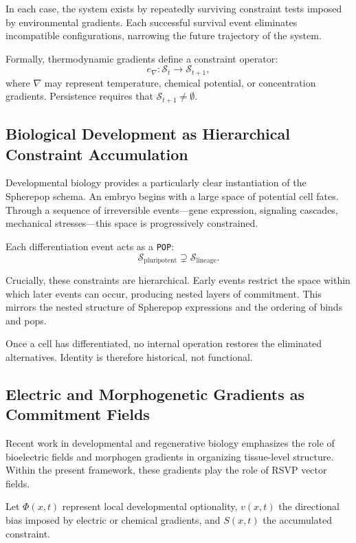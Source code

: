\documentclass[11pt]{article}
\begin{document}
In each case, the system exists by repeatedly surviving constraint tests imposed by environmental gradients. Each successful survival event eliminates incompatible configurations, narrowing the future trajectory of the system.

Formally, thermodynamic gradients define a constraint operator:
\[
e_{\nabla} : \mathcal{S}_t \rightarrow \mathcal{S}_{t+1},
\]
where $\nabla$ may represent temperature, chemical potential, or concentration gradients. Persistence requires that $\mathcal{S}_{t+1} \neq \emptyset$.

\subsection{Biological Development as Hierarchical Constraint Accumulation}

Developmental biology provides a particularly clear instantiation of the Spherepop schema. An embryo begins with a large space of potential cell fates. Through a sequence of irreversible events—gene expression, signaling cascades, mechanical stresses—this space is progressively constrained.

Each differentiation event acts as a \texttt{POP}:
\[
\mathcal{S}_{\text{pluripotent}} \supsetneq \mathcal{S}_{\text{lineage}}.
\]

Crucially, these constraints are hierarchical. Early events restrict the space within which later events can occur, producing nested layers of commitment. This mirrors the nested structure of Spherepop expressions and the ordering of binds and pops.

Once a cell has differentiated, no internal operation restores the eliminated alternatives. Identity is therefore historical, not functional.

\subsection{Electric and Morphogenetic Gradients as Commitment Fields}

Recent work in developmental and regenerative biology emphasizes the role of bioelectric fields and morphogen gradients in organizing tissue-level structure. Within the present framework, these gradients play the role of RSVP vector fields.

Let $\Phi(x,t)$ represent local developmental optionality, $v(x,t)$ the directional bias imposed by electric or chemical gradients, and $S(x,t)$ the accumulated constraint.
\end{document}
